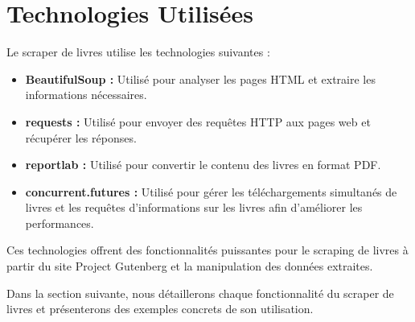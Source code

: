 \section{Technologies Utilisées}

Le scraper de livres utilise les technologies suivantes :

\begin{itemize}
    \item \textbf{BeautifulSoup :} Utilisé pour analyser les pages HTML et extraire les informations nécessaires.
    \item \textbf{requests :} Utilisé pour envoyer des requêtes HTTP aux pages web et récupérer les réponses.
    \item \textbf{reportlab :} Utilisé pour convertir le contenu des livres en format PDF.
    \item \textbf{concurrent.futures :} Utilisé pour gérer les téléchargements simultanés de livres et les requêtes d'informations sur les livres afin d'améliorer les performances.
\end{itemize}

Ces technologies offrent des fonctionnalités puissantes pour le scraping de livres à partir du site Project Gutenberg et la manipulation des données extraites.

Dans la section suivante, nous détaillerons chaque fonctionnalité du scraper de livres et présenterons des exemples concrets de son utilisation.
